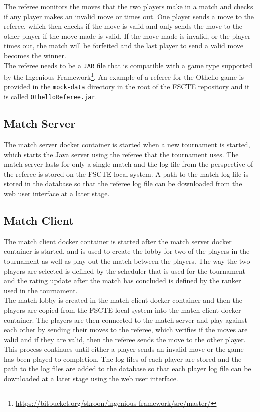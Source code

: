 \documentclass[a4paper, 11pt]{report}
\begin{document}
The referee monitors the moves that the two players make in a match and
checks if any player makes an invalid move or times out. One player sends a
move to the referee, which then checks if the move is valid and only sends
the move to the other player if the move made is valid. If the move made is
invalid, or the player times out, the match will be forfeited and the last player
to send a valid move becomes the winner. \\

The referee needs to be a \texttt{JAR} file that is compatible with a game type
supported by the Ingenious
Framework\footnote{\url{https://bitbucket.org/skroon/ingenious-framework/src/master/}}.
An example of a referee for the Othello game is provided in the \texttt{mock-data}
directory in the root of the FSCTE repository and it is called \texttt{OthelloReferee.jar}.

\subsection{Match Server}

The match server docker container is started when a new tournament is started,
which starts the Java server using the referee that the tournament uses. The match
server lasts for only a single match and the log file from the perspective of the
referee is stored on the FSCTE local system. A path to the match log file is stored
in the database so that the referee log file can be downloaded from the web user
interface at a later stage.

\subsection{Match Client}

The match client docker container is started after the match server docker container
is started, and is used to create the lobby for two of the players in the tournament
as well as play out the match between the players. The way the two players are
selected is defined by the scheduler that is used for the tournament and the
rating update after the match has concluded is defined by the ranker used in the
tournament. \\

The match lobby is created in the match client docker container and then the
players are copied from the FSCTE local system into the match client docker
container. The players are then connected to the match server and play against
each other by sending their moves to the referee, which verifies if the moves are
valid and if they are valid, then the referee sends the move to the other player.
This process continues until either a player sends an invalid move or the game
has been played to completion. The log files of each player are stored and the
path to the log files are added to the database so that each player log file can
be downloaded at a later stage using the web user interface.
\end{document}
